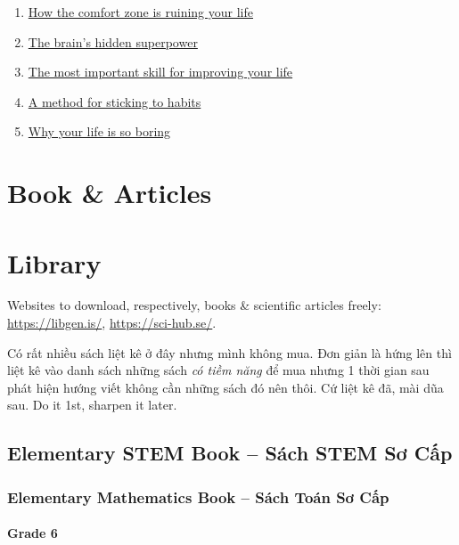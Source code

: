 \documentclass{article}
\begin{document}
\begin{enumerate}
	\item \href{https://www.youtube.com/watch?v=0h-IAlNjd4Q}{How the comfort zone is ruining your life}
	\item \href{https://www.youtube.com/watch?v=CkJGBM3rLLM}{The brain's hidden superpower}
	\item \href{https://www.youtube.com/watch?v=SIsCy663mz4}{The most important skill for improving your life}
	\item \href{https://www.youtube.com/watch?v=GtNEf9UyOLg}{A method for sticking to habits}
	\item \href{https://www.youtube.com/watch?v=-dYgnvrvQ3M}{Why your life is so boring}
\end{enumerate}


\section{Book \& Articles}


\section*{Library}
{\sf Websites to download, respectively, books \& scientific articles freely:} \url{https://libgen.is/}, \url{https://sci-hub.se/}.

Có rất nhiều sách liệt kê ở đây nhưng mình không mua. Đơn giản là hứng lên  thì liệt kê vào danh sách những sách \emph{có tiềm năng} để mua nhưng 1 thời gian sau phát hiện hướng viết không cần những sách đó nên thôi. Cứ liệt kê đã, mài dũa sau. Do it 1st, sharpen it later.

\subsection{Elementary STEM Book -- Sách STEM Sơ Cấp}

\subsubsection{Elementary Mathematics Book -- Sách Toán Sơ Cấp}

\paragraph{Grade 6}
\end{document}
